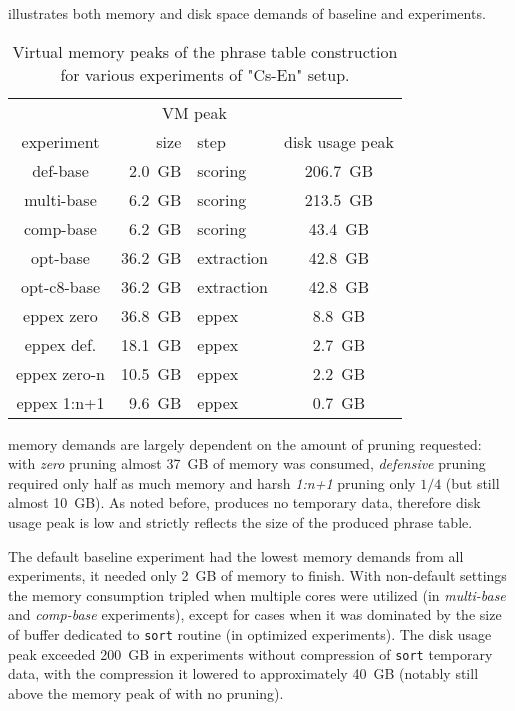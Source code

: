  illustrates both memory and disk space demands of baseline
and \eppex{} experiments.

\begin{table}[ht]
\centering
\begin{tabular}{ | c | r l | c | }
\hline
 & \multicolumn{2}{|c|}{VM peak} & \\
experiment & size & step & disk usage peak \\
\hline
\hline
def-base       &  2.0~GB &    scoring & 206.7~GB \\
multi-base     &  6.2~GB &    scoring & 213.5~GB \\
comp-base      &  6.2~GB &    scoring &  43.4~GB \\
opt-base       & 36.2~GB & extraction &  42.8~GB \\
opt-c8-base    & 36.2~GB & extraction &  42.8~GB \\
eppex zero     & 36.8~GB &      eppex &   8.8~GB \\
\hline
eppex def.     & 18.1~GB &      eppex &   2.7~GB \\
eppex zero-n   & 10.5~GB &      eppex &   2.2~GB \\
eppex 1:n+1    &  9.6~GB &      eppex &   0.7~GB \\
\hline
\end{tabular}
\caption{\label{cs-en-wmt13-vm-and-disk-usage-peaks}
Virtual memory peaks of the phrase table construction for various experiments of "Cs-En" setup.}
\end{table}

\Eppex{} memory demands are largely dependent on the amount of pruning requested: with \emph{zero}
pruning almost 37~GB of memory was consumed, \emph{defensive} pruning required only half as much
memory and harsh \emph{1:n+1} pruning only $1/4$ (but still almost 10~GB).
As noted before, \eppex{} produces no temporary data, therefore disk usage peak is low and strictly
reflects the size of the produced phrase table.

The default baseline experiment had the lowest memory demands from all experiments, it needed only 2~GB
of memory to finish.
With non-default settings the memory consumption tripled when multiple cores were utilized (in \emph{multi-base}
and \emph{comp-base} experiments), except for cases when it was dominated by the size of buffer dedicated
to \texttt{sort} routine (in optimized experiments).
The disk usage peak exceeded 200~GB in experiments without compression of \texttt{sort} temporary data,
with the compression it lowered to approximately 40~GB (notably still above the memory peak of \eppex{}
with no pruning).

